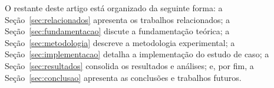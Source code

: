 \vspace{0.5em}
O restante deste artigo está organizado da seguinte forma: a Seção~\ref{sec:relacionados}
apresenta os trabalhos relacionados; a Seção~\ref{sec:fundamentacao} discute a fundamentação
teórica; a Seção~\ref{sec:metodologia} descreve a metodologia experimental; a
Seção~\ref{sec:implementacao} detalha a implementação do estudo de caso; a
Seção~\ref{sec:resultados} consolida os resultados e análises; e, por fim, a
Seção~\ref{sec:conclusao} apresenta as conclusões e trabalhos futuros.
